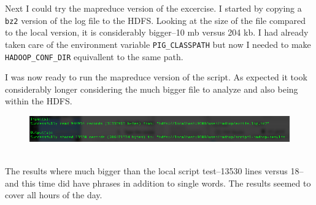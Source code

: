 \documentclass[10pt]{article}
\begin{document}
\par
Next I could try the mapreduce version of the excercise. I started by copying a \verb|bz2| version of the log file to the HDFS. Looking at the size of the file compared to the local version, it is considerably bigger--10 mb versus 204 kb. I had already taken care of the environment variable \verb|PIG_CLASSPATH| but now I needed to make \verb|HADOOP_CONF_DIR| equivallent to the same path.
\par
{}%
\hfill
{}%
\par
I was now ready to run the mapreduce version of the script. As expected it took considerably longer considering the much bigger file to analyze and also being within the HDFS.
\begin{figure}[!h]
\includegraphics[scale=0.37]{hadoop_output1.png}
\centering
\end{figure}\\
\indent The results where much bigger than the local script test--13530 lines versus 18--and this time did have phrases in addition to single words. The results seemed to cover all hours of the day.
\end{document}
